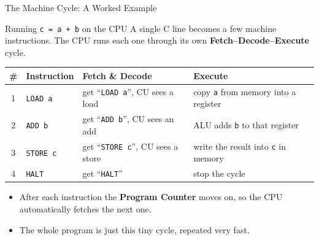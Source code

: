 \documentclass[aspectratio=169]{beamer}
\begin{document}
	\begin{frame}[fragile]{The Machine Cycle: A Worked Example}
		\vspace*{-0.10cm}
		\begin{block}{Running \texttt{c = a + b} on the CPU}
			A single C line becomes a few machine instructions. The CPU runs each one
			through its own \textbf{Fetch--Decode--Execute} cycle.
		\end{block}
		\renewcommand{\arraystretch}{1.35}
		\centering
		{\small
			\begin{tabular}{@{}c l p{4.4cm} p{4.7cm}@{}}
				\toprule
				\textbf{\#} & \textbf{Instruction} & \textbf{Fetch \& Decode} & \textbf{Execute} \\
				\midrule
				1 & \texttt{LOAD a}  & get ``\texttt{LOAD a}'', CU sees a load   & copy \texttt{a} from memory into a register \\
				2 & \texttt{ADD b}   & get ``\texttt{ADD b}'', CU sees an add    & ALU adds \texttt{b} to that register \\
				3 & \texttt{STORE c} & get ``\texttt{STORE c}'', CU sees a store & write the result into \texttt{c} in memory \\
				4 & \texttt{HALT}    & get ``\texttt{HALT}''                     & stop the cycle \\
				\bottomrule
		\end{tabular}}
		\vspace{0.15cm}
		\begin{itemize}\small
			\item After each instruction the \textbf{Program Counter} moves on, so the CPU
			automatically fetches the next one.
			\item The whole program is just this tiny cycle, repeated very fast.
		\end{itemize}
	\end{frame}
	
\end{document}
